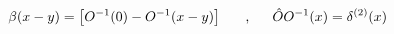 \begin{equation}
\beta(x-y)=\left[O^{-1}(0) -O^{-1}(x-y)\right]\makebox[.5in]{,}
\hat{O} O^{-1}(x)=\delta^{(2)}(x)
\end{equation}

